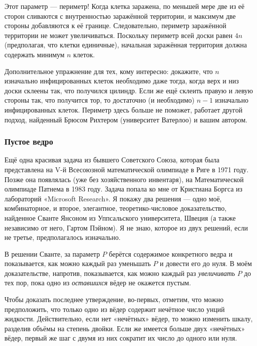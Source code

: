 Этот параметр --- периметр!
Когда клетка заражена, по меньшей мере две из её сторон сливаются с внутренностью заражённой территории, и максимум две стороны добавляются к её границе.
Следовательно, периметр заражённой территории не может увеличиваться.
Поскольку периметр всей доски равен $4n$ (предполагая, что клетки единичные), начальная заражённая территория должна содержать минимум $n$ клеток.
\heart

Дополнительное упражнение для тех, кому интересно: докажите, что $n$ изначально инфицированных клеток необходимо даже тогда, когда верх и низ доски склеены так, что получился цилиндр.
Если же ещё склеить правую и левую стороны так, что получится тор, то достаточно (и необходимо) $n-1$ изначально инфицированных клеток.
Периметр здесь больше не поможет,
работает другой подход, найденный Брюсом Рихтером (университет Ватерлоо) %
и вашим автором.

\subsubsection*{Пустое ведро}%

Ещё одна красивая задача из бывшего Советского Союза, которая была представлена на V-й Всесоюзной математической олимпиаде в Риге в 1971 году.
Позже она появлялась (уже без хозяйственного инвентаря), на Математической олимпиаде Патнема в 1983 году.
Задача попала ко мне от Кристиана Боргса из лабораторий «Microsoft Research». %
Я покажу два решения --- одно моё, комбинаторное, и второе, элегантное, теоретико-числовое доказательство, найденное Сванте Янсоном из Уппсальского университета, Швеция %
(а также независимо от него, Гартом Пэйном). %
Я не знаю, которое из двух решений, если не третье, предполагалось изначально.

\medskip

В решении Сванте, за параметр $P$ берётся содержимое конкретного ведра и показывается, как можно каждый раз уменьшать $P$ и довести его до нуля.
В моём доказательстве, напротив, показывается, как можно каждый раз \emph{увеличивать} $P$ до тех пор, пока одно из \emph{оставшихся} вёдер не окажется пустым.

Чтобы доказать последнее утверждение, во-первых, отметим, что можно предположить, что только одно из вёдер содержит нечётное число унций жидкости.
Действительно, если нет «нечётных» вёдер, то можно изменить шкалу, разделив объёмы на степень двойки.
Если же имеется больше двух «нечётных» вёдер, первый же шаг с двумя из них сократит их число до одного или нуля.

